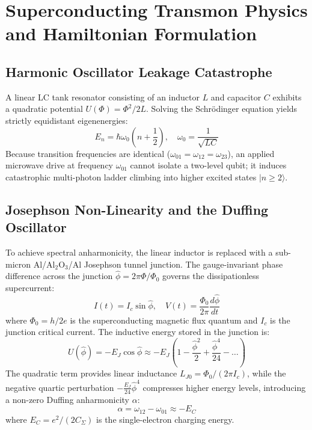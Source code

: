 \documentclass[10pt,journal,compsoc]{IEEEtran}
\begin{document}
\section{Superconducting Transmon Physics and Hamiltonian Formulation}

\subsection{Harmonic Oscillator Leakage Catastrophe}
A linear LC tank resonator consisting of an inductor $L$ and capacitor $C$ exhibits a quadratic potential $U(\Phi) = \Phi^2 / 2L$. Solving the Schr\"odinger equation yields strictly equidistant eigenenergies:
\begin{equation}
E_n = \hbar \omega_0 \left(n + \frac{1}{2}\right), \quad \omega_0 = \frac{1}{\sqrt{LC}}
\end{equation}
Because transition frequencies are identical ($\omega_{01} = \omega_{12} = \omega_{23}$), an applied microwave drive at frequency $\omega_{01}$ cannot isolate a two-level qubit; it induces catastrophic multi-photon ladder climbing into higher excited states $|n \ge 2\rangle$.

\subsection{Josephson Non-Linearity and the Duffing Oscillator}
To achieve spectral anharmonicity, the linear inductor is replaced with a sub-micron Al/$\text{Al}_2\text{O}_3$/Al Josephson tunnel junction. The gauge-invariant phase difference across the junction $\hat{\phi} = 2\pi \Phi / \Phi_0$ governs the dissipationless supercurrent:
\begin{equation}
I(t) = I_c \sin\hat{\phi}, \quad V(t) = \frac{\Phi_0}{2\pi} \frac{d\hat{\phi}}{dt}
\end{equation}
where $\Phi_0 = h/2e$ is the superconducting magnetic flux quantum and $I_c$ is the junction critical current. The inductive energy stored in the junction is:
\begin{equation}
U(\hat{\phi}) = -E_J \cos\hat{\phi} \approx -E_J \left( 1 - \frac{\hat{\phi}^2}{2} + \frac{\hat{\phi}^4}{24} - \dots \right)
\end{equation}
The quadratic term provides linear inductance $L_{J0} = \Phi_0 / (2\pi I_c)$, while the negative quartic perturbation $-\frac{E_J}{24}\hat{\phi}^4$ compresses higher energy levels, introducing a non-zero Duffing anharmonicity $\alpha$:
\begin{equation}
\alpha = \omega_{12} - \omega_{01} \approx -E_C
\end{equation}
where $E_C = e^2 / (2C_\Sigma)$ is the single-electron charging energy.
\end{document}
